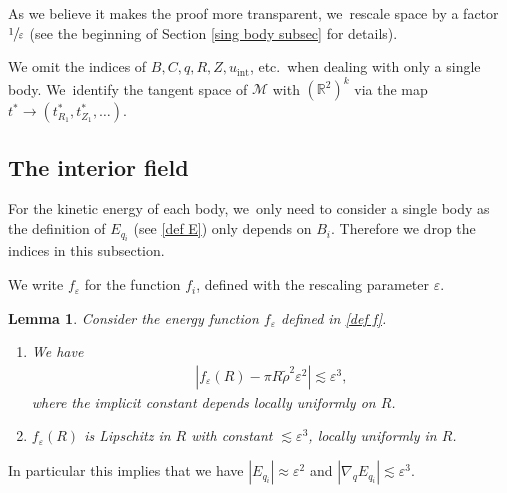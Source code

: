 \documentclass[10pt]{amsart}
\let\epsilon\varepsilon
\newtheorem{lemma}[theorem]{Lemma}
\theoremstyle{definition}
\newcommand\R{\mathbb{R}}
\let\eps\epsilon
\begin{document}
As we believe it makes the proof more transparent, we~rescale space by a factor $\sfrac{1}{\eps}$ (see the beginning of Section \ref{sing body subsec} for details).

We omit the indices of $B,C,q, R, Z, u_\mathrm{int}$, etc.\ when dealing with only a single body. We~identify the tangent space of $\mathcal{M}$ with $(\R^2)^k$ via the map $t^*\to (t_{R_1}^*,t_{Z_1}^*,\dots)$.

\subsection{The interior field}

For the kinetic energy of each body, we~only need to consider a single body as the definition of $E_{q_i}$ (see \eqref{def E}) only depends on $B_i$. Therefore we drop the indices in this subsection.

We write $f_\eps$ for the function $f_i$, defined with the rescaling parameter $\eps$.

\begin{lemma}\label{InteriorField}
Consider the energy function $f_\eps$ defined in \eqref{def f}.\begin{enumerate}
\item\label{InteriorFielda}
We have
\begin{align*}
\left|f_\eps(R)-\pi R\tilde{\rho}^2\eps^2\right|\lesssim \eps^3,
\end{align*}
where the implicit constant depends locally uniformly on $R$.

\item\label{InteriorFieldb}
$f_\eps(R)$ is Lipschitz in $R$ with constant $\lesssim \eps^3$, locally uniformly in $R$.
\end{enumerate}
\end{lemma}

In particular this implies that we have $|E_{q_i}|\approx \eps^2$ and $|\nabla_q E_{q_i}|\lesssim \eps^3$.
\end{document}
